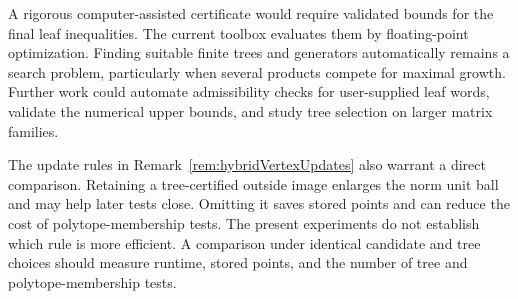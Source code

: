 A rigorous computer-assisted certificate would require validated bounds for the final leaf inequalities.
The current toolbox evaluates them by floating-point optimization.
Finding suitable finite trees and generators automatically remains a search problem, particularly when several products compete for maximal growth.
Further work could automate admissibility checks for user-supplied leaf words, validate the numerical upper bounds, and study tree selection on larger matrix families.

The update rules in Remark~\ref{rem:hybridVertexUpdates} also warrant a direct comparison.
Retaining a tree-certified outside image enlarges the norm unit ball and may help later tests close.
Omitting it saves stored points and can reduce the cost of polytope-membership tests.
The present experiments do not establish which rule is more efficient.
A comparison under identical candidate and tree choices should measure runtime, stored points, and the number of tree and polytope-membership tests.
